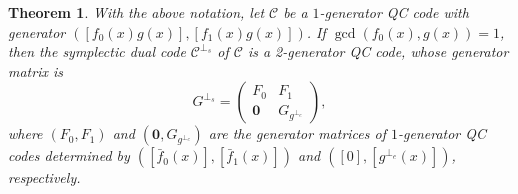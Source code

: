 \documentclass[journal]{IEEEtran}
\newtheorem{theorem}{Theorem}
\begin{document}
\begin{theorem}\label{Dual_Structure} 
	With the above notation,
	let $\mathscr{C}$ be a $1$-generator QC code with generator $(\left[f_0(x)g(x)\right],\left[f_1(x)g(x)\right])$.
	 If $\gcd(f_0(x),g(x))=1$,		
then the symplectic dual code $\mathscr{C}^{\perp_s}$ of $\mathscr{C}$ is a 2-generator QC code, whose generator matrix is
\begin{equation}
	G^{\perp_{s}}=
	\begin{pmatrix}
		F_{0}	& F_{1}\\
		\mathbf{0}&G_{g^{\perp_e}}
	\end{pmatrix},
\end{equation}
where $(F_{0},F_1)$ and $(\mathbf{0},G_{g^{\perp_e}})$ are the generator matrices of $1$-generator QC codes determined by $(\left[ \bar{f}_{0}(x)\right], \left[ \bar{f}_{1}(x)\right])$ and $(\left[ 0\right], \left[ g^{\perp_e}(x)\right])$, respectively. 
\end{theorem}
\end{document}

